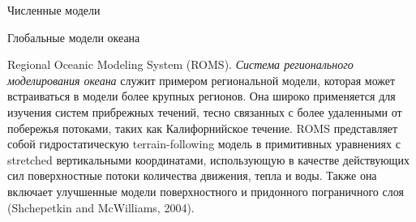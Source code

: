 \begin{chapter}{Численные модели}
\begin{section}{Глобальные модели океана}
\begin{paragraph}{Regional Oceanic Modeling System (ROMS).}
\emph{Система регионального моделирования океана} служит примером региональной 
модели, которая может встраиваться в модели более крупных регионов. 
Она широко применяется для изучения систем
прибрежных течений, тесно связанных с более удаленными от побережья потоками,
таких как Калифорнийское течение. ROMS представляет собой гидростатическую
terrain-following модель в примитивных уравнениях с stretched вертикальными
координатами, использующую в качестве действующих сил поверхностные потоки
количества движения, тепла и воды. Также она включает улучшенные модели
поверхностного и придонного пограничного слоя (Shchepetkin and McWilliams, 2004).
% 
\end{paragraph}


\end{section}
\end{chapter}
